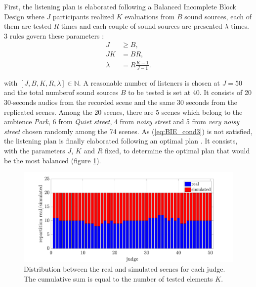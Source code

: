 \documentclass[a4,11pt,twocolumn]{article}
\begin{document}
First, the listening plan is elaborated following a Balanced Incomplete Block Design \cite{dagnelie_principes_2003} where $J$ participants realized $K$ evaluations from $B$ sound sources, each of them are tested $R$ times and each couple of sound sources are presented $\lambda$ times. 3 rules govern these parameters :
\begin{subequations}\label{eq:BIE_cond}
\begin{align}
J &\geq B, \label{eq:BIE_cond1}\\
JK &= BR, \label{eq:BIE_cond2}\\
\lambda &= R\frac{K-1}{J-1}. \label{eq:BIE_cond3}
\end{align}
\end{subequations}

with $\left[J, B, K, R, \lambda\right] \in \mathbb{N}$. A reasonable number of listeners is chosen at $J = 50$ and the total numberof sound sources $B$ to be tested is set at 40. It consists of 20 30-seconds audios from the recorded scene and the same 30 seconds from the replicated scenes. Among the 20 scenes, there are 5 scenes which belong to the ambience \textit{Park}, 6 from \textit{Quiet street}, 4 from \textit{noisy street} and 5 from \textit{very noisy street} chosen randomly among the 74 scenes. As (\ref{eq:BIE_cond3}) is not satisfied, the listening plan is finally elaborated following an optimal plan \cite{pages_blocs_2007}. It consists, with the parameters $J$, $K$ and $R$ fixed, to determine the optimal plan that would be the most balanced (figure \ref{fig:repartition}).\\

\begin{figure}[ht]
\centering
\includegraphics[width = \linewidth]{./pictures/repartition-real-simulated.pdf}
\caption{Distribution between the real and simulated scenes for each judge. The cumulative sum is equal to the number of tested elements $K$.}
\label{fig:repartition}
\end{figure}
\end{document}
